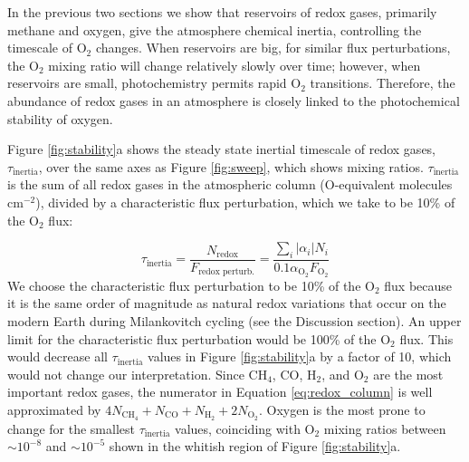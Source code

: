 In the previous two sections we show that reservoirs of redox gases, primarily methane and oxygen, give the atmosphere chemical inertia, controlling the timescale of O$_2$ changes. When reservoirs are big, for similar flux perturbations, the O$_2$ mixing ratio will change relatively slowly over time; however, when reservoirs are small, photochemistry permits rapid O$_2$ transitions. Therefore, the abundance of redox gases in an atmosphere is closely linked to the photochemical stability of oxygen.

Figure \ref{fig:stability}a shows the steady state inertial timescale of redox gases, $\tau_\mathrm{inertia}$, over the same axes as Figure \ref{fig:sweep}, which shows mixing ratios. $\tau_\mathrm{inertia}$ is the sum of all redox gases in the atmospheric column (O-equivalent molecules cm$^{-2}$), divided by a characteristic flux perturbation, which we take to be 10\% of the O$_2$ flux: 

\begin{equation} \label{eq:redox_column}
  \tau_\text{inertia} = \frac{N_\mathrm{redox}}{F_\text{redox perturb.}} = \frac{\sum_i | \alpha_i | N_i}{0.1 \alpha_\mathrm{O_2} F_\mathrm{O_2}}
\end{equation}
We choose the characteristic flux perturbation to be 10\% of the O$_2$ flux because it is the same order of magnitude as natural redox variations that occur on the modern Earth during Milankovitch cycling (see the Discussion section). An upper limit for the characteristic flux perturbation would be 100\% of the O$_2$ flux. This would decrease all $\tau_\mathrm{inertia}$ values in Figure \ref{fig:stability}a by a factor of 10, which would not change our interpretation. Since CH$_4$, CO, H$_2$, and O$_2$ are the most important redox gases, the numerator in Equation \eqref{eq:redox_column} is well approximated by $4 N_\mathrm{CH_4} + N_\mathrm{CO} + N_\mathrm{H_2} + 2 N_\mathrm{O_2}$. Oxygen is the most prone to change for the smallest $\tau_\mathrm{inertia}$ values, coinciding with O$_2$ mixing ratios between $\sim10^{-8}$ and $\sim10^{-5}$ shown in the whitish region of Figure \ref{fig:stability}a.

